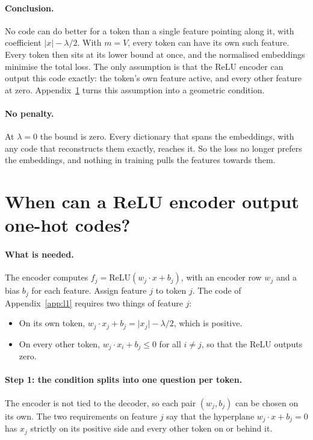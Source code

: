 \documentclass[11pt]{article}
\newcommand{\norm}[1]{\lvert #1\rvert}
\begin{document}
\paragraph{Conclusion.} No code can do better for a token than a single feature pointing along it, with coefficient $\norm{x} - \lambda/2$. With $m = V$, every token can have its own such feature. Every token then sits at its lower bound at once, and the normalised embeddings minimise the total loss. The only assumption is that the ReLU encoder can output this code exactly: the token's own feature active, and every other feature at zero. Appendix~\ref{app:hull} turns this assumption into a geometric condition.

\paragraph{No penalty.} At $\lambda = 0$ the bound is zero. Every dictionary that spans the embeddings, with any code that reconstructs them exactly, reaches it. So the loss no longer prefers the embeddings, and nothing in training pulls the features towards them.

\section{When can a ReLU encoder output one-hot codes?}
\label{app:hull}

\paragraph{What is needed.} The encoder computes $f_j = \mathrm{ReLU}(w_j \cdot x + b_j)$, with an encoder row $w_j$ and a bias $b_j$ for each feature. Assign feature $j$ to token $j$. The code of Appendix~\ref{app:l1} requires two things of feature $j$:
\begin{itemize}[leftmargin=*]
\item On its own token, $w_j \cdot x_j + b_j = \norm{x_j} - \lambda/2$, which is positive.
\item On every other token, $w_j \cdot x_i + b_j \le 0$ for all $i \ne j$, so that the ReLU outputs zero.
\end{itemize}

\paragraph{Step 1: the condition splits into one question per token.} The encoder is not tied to the decoder, so each pair $(w_j, b_j)$ can be chosen on its own. The two requirements on feature $j$ say that the hyperplane $w_j \cdot x + b_j = 0$ has $x_j$ strictly on its positive side and every other token on or behind it.
\end{document}
